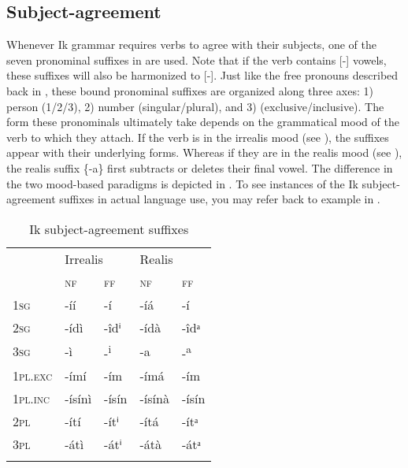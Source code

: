\subsection{Subject-agreement}\label{sec:8.7}


Whenever Ik grammar requires verbs to agree with their subjects, one of the seven pronominal suffixes in  are used. Note that if the verb contains [-] vowels, these suffixes will also be harmonized to [-]. Just like the free pronouns described back in , these bound pronominal suffixes are organized along three axes: 1) person (1/2/3), 2) number (singular/plural), and 3)  (exclusive/inclusive). The form these pronominals ultimately take depends on the grammatical mood of the verb to which they attach. If the verb is in the irrealis mood (see ), the suffixes appear with their underlying forms. Whereas if they are in the realis mood (see ), the realis suffix \{-a\} first subtracts or deletes their final vowel. The difference in the two mood-based paradigms is depicted in . To see instances of the Ik subject-agreement suffixes in actual language use, you may refer back to example  in .


\begin{table}
\caption{Ik subject-agreement suffixes}
\label{tab:verbs:subj}


\begin{tabularx}{\textwidth}{XXXXX}
\lsptoprule

& \multicolumn{2}{X}{Irrealis} & \multicolumn{2}{X}{Realis}\\
& \textsc{nf} & \textsc{ff} & \textsc{nf} & \textsc{ff}\\
\midrule
\textsc{1sg} & {}-íí & {}-í & {}-íá & {}-í\\
\textsc{2sg} & {}-ídì & {}-îdⁱ & {}-ídà & {}-îdᵃ\\
\textsc{3sg} & {}-ì & {}-\textsuperscript{i} & {}-a & {}-\textsuperscript{a}\\
\textsc{1pl.exc} & {}-ímí & {}-ím & {}-ímá & {}-ím\\
\textsc{1pl.inc} & {}-ísínì & {}-ísín & {}-ísínà & {}-ísín\\
\textsc{2pl} & {}-ítí & {}-ítⁱ & {}-ítá & {}-ítᵃ\\
\textsc{3pl} & {}-átì & {}-átⁱ & {}-átà & {}-átᵃ\\
\lspbottomrule
\end{tabularx}
\end{table}






